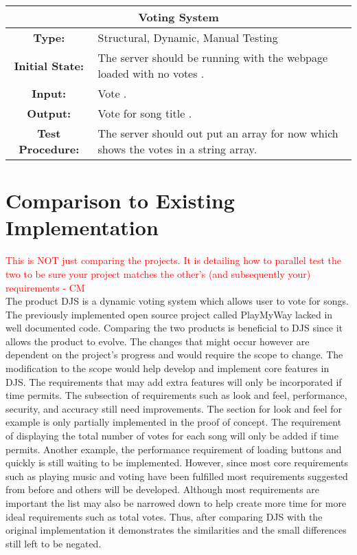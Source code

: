 \documentclass[12pt, titlepage]{article}
\begin{document}
\begin{center}
\begin{table}[H]
\begin{tabularx}{\textwidth}{| c X |}
\hline
\multicolumn{2}{|c|}{\textbf{Voting System}}\\
\hline
\textbf{Type: } & Structural, Dynamic, Manual Testing\\

\textbf{Initial State: } & The server should be running with the webpage loaded with no votes .\\

\textbf{Input: } & Vote .\\

\textbf{Output: } & Vote for song title .\\

\textbf{Test Procedure: } & The server should out put an array for now which shows the votes in a string array. \\
\hline
\end{tabularx}
\end{table}
\end{center}



	
\section{Comparison to Existing Implementation}	
\textcolor{red}{This is NOT just comparing the projects. It is detailing how to parallel test the two to be sure your project matches the other's (and subsequently your) requirements - CM} \\
The product DJS is a dynamic voting system which allows user to vote for songs. The previously implemented open source project called PlayMyWay lacked in well documented code. Comparing the two products is beneficial to DJS since it allows the product to evolve. The changes that might occur however are dependent on the project's progress and would require the scope to change. The modification to the scope would help develop and implement core features in DJS. The requirements that may add extra features will only be incorporated if time permits. The subsection of requirements such as look and feel, performance, security, and accuracy still need improvements. The section for look and feel for example is only partially implemented in the proof of concept. The requirement of displaying the total number of votes for each song will only be added if time permits. Another example, the performance requirement of loading buttons and quickly is still waiting to be implemented.  However, since most core requirements such as playing music and voting have been fulfilled most requirements suggested from before and others will be developed. Although most requirements are important  the list may also be narrowed down to help create more time for more ideal requirements such as total votes. Thus, after comparing DJS with the original implementation it demonstrates the similarities and the small differences still left to be negated.
				
\end{document}
